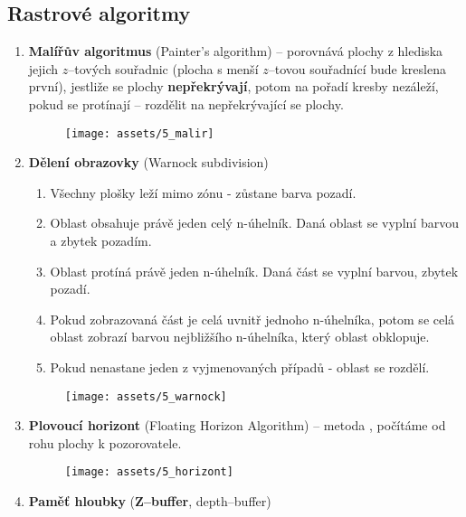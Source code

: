 \subsection{Rastrové algoritmy}
\begin{enumerate}
    \item \textbf{Malířův algoritmus} (Painter's algorithm) -- porovnává plochy z hlediska jejich $z$--tových souřadnic (plocha s menší $z$--tovou souřadnící bude kreslena první), jestliže se plochy \textbf{nepřekrývají}, potom na pořadí kresby nezáleží, pokud se protínají -- rozdělit na nepřekrývající se plochy.
          \begin{figure}[H]
              \centering
              \texttt{[image: assets/5\_malir]}
          \end{figure}
    \item \textbf{Dělení obrazovky }(Warnock subdivision)
          \begin{enumerate}
              \item Všechny plošky leží mimo zónu - zůstane barva pozadí.
              \item Oblast obsahuje právě jeden celý n-úhelník. Daná oblast se vyplní barvou a zbytek pozadím.
              \item Oblast protíná právě jeden n-úhelník. Daná část se vyplní barvou, zbytek pozadí.
              \item Pokud zobrazovaná část je celá uvnitř jednoho n-úhelníka, potom se celá oblast zobrazí barvou nejbližšího n-úhelníka, který oblast obklopuje.
              \item Pokud nenastane jeden z vyjmenovaných případů - oblast se rozdělí.
          \end{enumerate}
          \begin{figure}[H]
              \centering
              \texttt{[image: assets/5\_warnock]}
          \end{figure}
    \item \textbf{Plovoucí horizont} (Floating Horizon Algorithm) -- metoda , počítáme od  rohu plochy k  pozorovatele.
          \begin{figure}[H]
              \centering
              \texttt{[image: assets/5\_horizont]}
          \end{figure}
    \item \textbf{Paměť hloubky} (\textbf{Z--buffer}, depth--buffer)
          \begin{enumerate}

\end{enumerate}
\end{enumerate}
